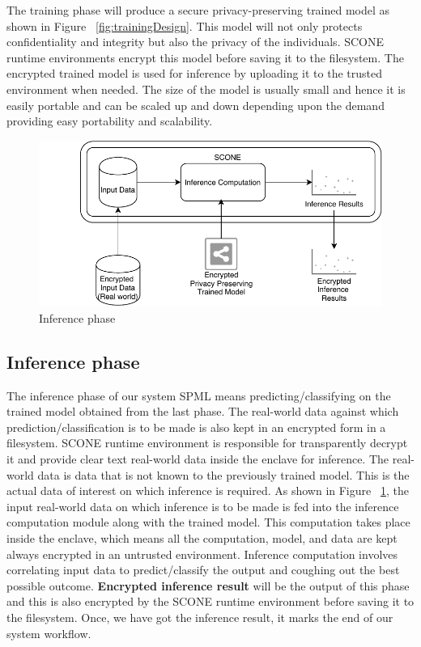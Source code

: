 The training phase will produce a secure privacy-preserving trained model as shown in Figure ~\ref{fig:trainingDesign}. This model will not only protects confidentiality and integrity but also the privacy of the individuals. SCONE runtime environments encrypt this model before saving it to the filesystem. The encrypted trained model is used for inference by uploading it to the trusted environment when needed. The size of the model is usually small and hence it is easily portable and can be scaled up and down depending upon the demand providing easy portability and scalability. 
\begin{figure}
    \centering
    \includegraphics[width=\linewidth]{images/Inference.pdf}
    \caption{Inference phase}
    \label{fig:inferenceDesign}
\end{figure}
\subsection{Inference phase}
The inference phase of our system SPML means predicting/classifying on the trained model obtained from the last phase. The real-world data against which prediction/classification is to be made is also kept in an encrypted form in a filesystem. SCONE runtime environment is responsible for transparently decrypt it and provide clear text real-world data inside the enclave for inference. The real-world data is data that is not known to the previously trained model. This is the actual data of interest on which inference is required. As shown in Figure ~\ref{fig:inferenceDesign}, the input real-world data on which inference is to be made is fed into the inference computation module along with the trained model. This computation takes place inside the enclave, which means all the computation, model, and data are kept always encrypted in an untrusted environment. Inference computation involves correlating input data to predict/classify the output and coughing out the best possible outcome. \textbf{Encrypted inference result} will be the output of this phase and this is also encrypted by the SCONE runtime environment before saving it to the filesystem. Once, we have got the inference result, it marks the end of our system workflow.

